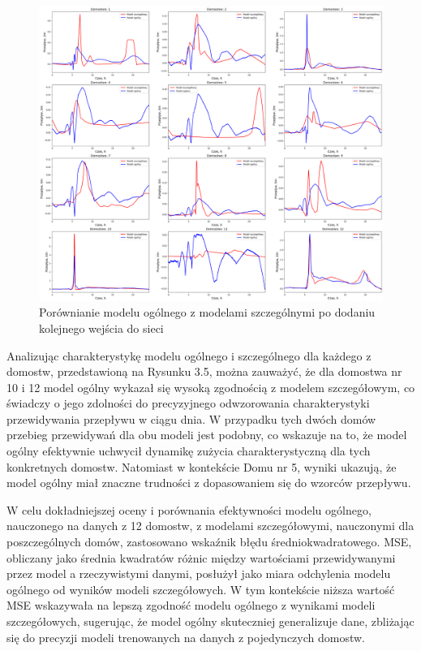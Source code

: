 \documentclass[a4paper,twoside,12pt]{book}
\begin{document}
\begin{figure}[!h]
  \centering
  \includegraphics[width=1\textwidth]{img/szczegółowy_ogolny_porówniaie_dodatkowy.png}
  \caption{Porównianie modelu ogólnego z modelami szczególnymi po dodaniu kolejnego wejścia do sieci}
  \label{fig:etykieta-rysunku}
\end{figure}

Analizując charakterystykę modelu ogólnego i szczególnego dla każdego z domostw, przedstawioną na Rysunku 3.5, można zauważyć, że dla domostwa nr 10 i 12 model ogólny wykazał się wysoką zgodnością z modelem szczegółowym, co świadczy o jego zdolności do precyzyjnego odwzorowania charakterystyki przewidywania przepływu w ciągu dnia. W przypadku tych dwóch domów przebieg przewidywań dla obu modeli jest podobny, co wskazuje na to, że model ogólny efektywnie uchwycił dynamikę zużycia charakterystyczną dla tych konkretnych domostw. Natomiast w kontekście Domu nr 5, wyniki ukazują, że model ogólny miał znaczne trudności z dopasowaniem się do wzorców przepływu.

W celu dokładniejszej oceny i porównania efektywności modelu ogólnego, nauczonego na danych z 12 domostw, z modelami szczegółowymi, nauczonymi dla poszczególnych domów, zastosowano wskaźnik błędu średniokwadratowego. MSE, obliczany jako średnia kwadratów różnic między wartościami przewidywanymi przez model a rzeczywistymi danymi, posłużył jako miara odchylenia modelu ogólnego od wyników modeli szczegółowych. W tym kontekście niższa wartość MSE wskazywała na lepszą zgodność modelu ogólnego z wynikami modeli szczegółowych, sugerując, że model ogólny skuteczniej generalizuje dane, zbliżając się do precyzji modeli trenowanych na danych z pojedynczych domostw.
\end{document}
